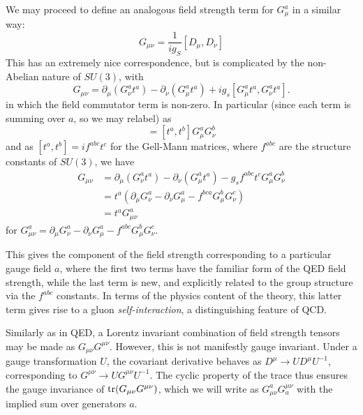 We may proceed to define an analogous field strength term for $G_{\mu}^{a}$ in a similar way:
\begin{equation}
G_{\mu\nu} = \frac{1}{ig_{S}}[D_{\mu}, D_{\nu}]
\end{equation}
This has an extremely nice correspondence, but is complicated by the non-Abelian nature of $SU(3)$, with
\begin{equation}
G_{\mu\nu} = \partial_{\mu}(G_{\nu}^{a}t^{a}) - \partial_{\nu}(G_{\mu}^{a}t^{a}) + ig_{s}[G_{\mu}^{a}t^{a}, G_{\nu}^{a}t^{a}].
\end{equation}
in which the field commutator term is non-zero. In particular (since each term is summing over $a$, so we may relabel) as
\begin{equation} 
[G_{\mu}^{a}t^{a}, G_{\nu}^{b}t^{b}] = [t^{a}, t^{b}]G_{\mu}^{a}G_{\nu}^{b}
\end{equation}
and as $[t^{a}, t^{b}] = if^{abc}t^c$ for the Gell-Mann matrices, where $f^{abc}$ are the structure
constants of $SU(3)$, we have
\begin{align}
G_{\mu\nu} &= \partial_{\mu}(G_{\nu}^{a}t^{a}) - \partial_{\nu}(G_{\mu}^{a}t^{a}) -g_{s}f^{abc}t^cG_{\mu}^{a}G_{\nu}^{b}\\
&=t^{a}(\partial_{\mu}G_{\nu}^{a}-\partial_{\nu}G_{\mu}^{a}-f^{bca}G_{\mu}^{b}G_{\nu}^{c})\\
&=t^{a}G_{\mu\nu}^a
\end{align}
for $G_{\mu\nu}^a = \partial_{\mu}G_{\nu}^{a}-\partial_{\nu}G_{\mu}^{a}-f^{abc}G_{\mu}^{b}G_{\nu}^{c}$.

This gives the component of the field strength corresponding to a particular gauge field $a$, where 
the first two terms have the familiar form of the QED field strength, while the last term is new, and 
explicitly related to the group structure via the $f^{abc}$ constants. In terms of the physics content of the 
theory, this latter term gives rise to a gluon \emph{self-interaction}, a distinguishing feature of QCD.

Similarly as in QED, a Lorentz invariant combination of field strength tensors may be made as $G_{\mu\nu}G^{\mu\nu}$.
However, this is not manifestly gauge invariant. Under a gauge transformation $U$, the covariant derivative 
behaves as $D^{\mu}\rightarrow UD^{\mu}U^{-1}$, corresponding to $G^{\mu\nu}\rightarrow UG^{\mu\nu}U^{-1}$.
The cyclic property of the trace thus ensures the gauge invariance of $\tr(G_{\mu\nu}G^{\mu\nu})$, which we 
will write as $G_{\mu\nu}^a G^{\mu\nu}_a$ with the implied sum over generators $a$.

